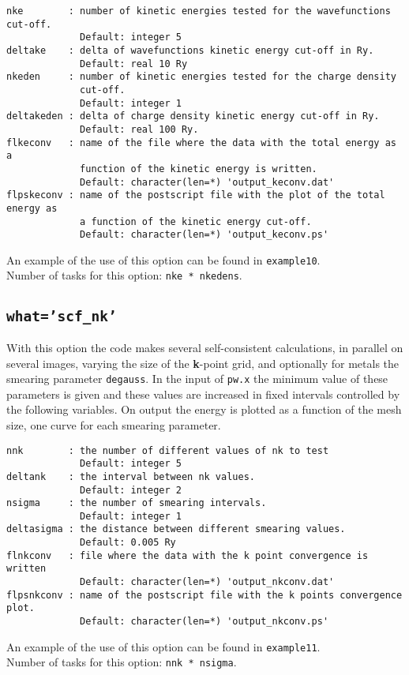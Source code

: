 \documentclass[12pt,a4paper]{article}
\begin{document}
\begin{verbatim}
nke        : number of kinetic energies tested for the wavefunctions cut-off.
             Default: integer 5
deltake    : delta of wavefunctions kinetic energy cut-off in Ry.
             Default: real 10 Ry
nkeden     : number of kinetic energies tested for the charge density
             cut-off.
             Default: integer 1
deltakeden : delta of charge density kinetic energy cut-off in Ry.
             Default: real 100 Ry.
flkeconv   : name of the file where the data with the total energy as a
             function of the kinetic energy is written.
             Default: character(len=*) 'output_keconv.dat'
flpskeconv : name of the postscript file with the plot of the total energy as
             a function of the kinetic energy cut-off.
             Default: character(len=*) 'output_keconv.ps'
\end{verbatim}
An example of the use of this option can be found in \texttt{example10}. \\
Number of tasks for this option: \texttt{nke * nkedens}.

\subsection{\texttt{what='scf\_nk'}}
With this option the code makes several self-consistent calculations, 
in parallel on several images, varying the size of the {\bf k}-point grid, 
and optionally for metals the smearing parameter \texttt{degauss}. In the 
input of \texttt{pw.x} the minimum value of these parameters is given and 
these values are increased in fixed intervals controlled by the following 
variables. On output the energy is plotted as a function of the mesh size, 
one curve for each smearing parameter.

\begin{verbatim}
nnk        : the number of different values of nk to test
             Default: integer 5
deltank    : the interval between nk values.
             Default: integer 2
nsigma     : the number of smearing intervals.
             Default: integer 1 
deltasigma : the distance between different smearing values.
             Default: 0.005 Ry
flnkconv   : file where the data with the k point convergence is written
             Default: character(len=*) 'output_nkconv.dat'
flpsnkconv : name of the postscript file with the k points convergence plot.
             Default: character(len=*) 'output_nkconv.ps'
\end{verbatim}
An example of the use of this option can be found in \texttt{example11}. \\
Number of tasks for this option: \texttt{nnk * nsigma}.
\end{document}
